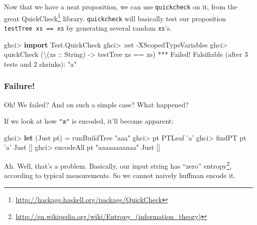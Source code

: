 \documentclass[]{article}
\newenvironment{Shaded}{}{}
\newcommand{\KeywordTok}[1]{\textcolor[rgb]{0.00,0.44,0.13}{\textbf{{#1}}}}
\newcommand{\DataTypeTok}[1]{\textcolor[rgb]{0.56,0.13,0.00}{{#1}}}
\newcommand{\DecValTok}[1]{\textcolor[rgb]{0.25,0.63,0.44}{{#1}}}
\newcommand{\CharTok}[1]{\textcolor[rgb]{0.25,0.44,0.63}{{#1}}}
\newcommand{\StringTok}[1]{\textcolor[rgb]{0.25,0.44,0.63}{{#1}}}
\newcommand{\OtherTok}[1]{\textcolor[rgb]{0.00,0.44,0.13}{{#1}}}
\newcommand{\FunctionTok}[1]{\textcolor[rgb]{0.02,0.16,0.49}{{#1}}}
\newcommand{\NormalTok}[1]{{#1}}
\renewcommand{\href}[2]{#2\footnote{\url{#1}}}
\begin{document}
Now that we have a neat proposition, we can use \texttt{quickcheck} on
it, from the great
\href{http://hackage.haskell.org/package/QuickCheck}{QuickCheck}
library. \texttt{quickcheck} will basically test our proposition
\texttt{testTree\ xs\ ==\ xs} by generating several random
\texttt{xs}'s.

\begin{Shaded}
\begin{Highlighting}[]
\NormalTok{ghci}\FunctionTok{>} \KeywordTok{import }\DataTypeTok{Test.QuickCheck}
\NormalTok{ghci}\FunctionTok{>} \FunctionTok{:}\NormalTok{set }\FunctionTok{-}\DataTypeTok{XScopedTypeVariables}
\NormalTok{ghci}\FunctionTok{>} \NormalTok{quickCheck (\textbackslash{}(}\OtherTok{xs ::} \DataTypeTok{String}\NormalTok{) }\OtherTok{->} \NormalTok{testTree xs }\FunctionTok{==} \NormalTok{xs)}
\FunctionTok{***} \DataTypeTok{Failed}\FunctionTok{!} \DataTypeTok{Falsifiable} \NormalTok{(after }\DecValTok{3} \NormalTok{tests and }\DecValTok{2} \NormalTok{shrinks)}\FunctionTok{:}
\StringTok{"a"}
\end{Highlighting}
\end{Shaded}

\subsubsection{Failure!}\label{failure}

Oh! We failed? And on such a simple case? What happened?

If we look at how \texttt{"a"} is encoded, it'll become apparent:

\begin{Shaded}
\begin{Highlighting}[]
\NormalTok{ghci}\FunctionTok{>} \KeywordTok{let} \NormalTok{(}\DataTypeTok{Just} \NormalTok{pt) }\FunctionTok{=} \NormalTok{runBuildTree }\StringTok{"aaa"}
\NormalTok{ghci}\FunctionTok{>} \NormalTok{pt}
\DataTypeTok{PTLeaf} \CharTok{'a'}
\NormalTok{ghci}\FunctionTok{>} \NormalTok{findPT pt }\CharTok{'a'}
\DataTypeTok{Just} \NormalTok{[]}
\NormalTok{ghci}\FunctionTok{>} \NormalTok{encodeAll pt }\StringTok{"aaaaaaaaaaa"}
\DataTypeTok{Just} \NormalTok{[]}
\end{Highlighting}
\end{Shaded}

Ah. Well, that's a problem. Basically, our input string has
\href{http://en.wikipedia.org/wiki/Entropy_(information_theory)}{``zero''
entropy}, according to typical measurements. So we cannot naively
huffman encode it.
\end{document}
